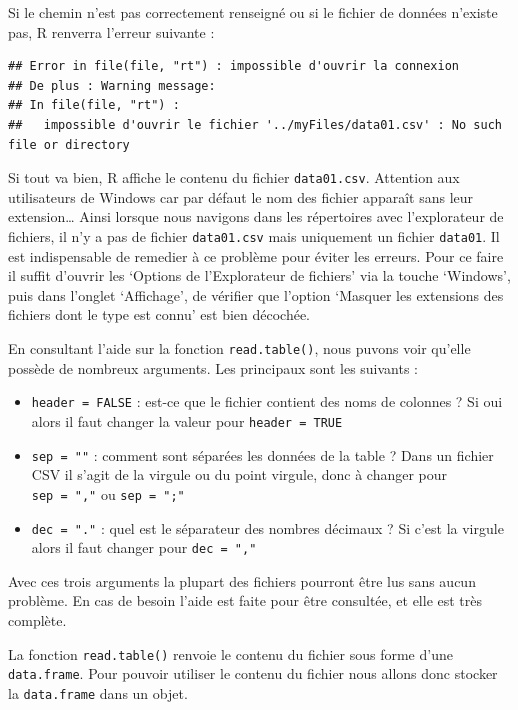 \documentclass[]{book}
\providecommand{\tightlist}{%
  \setlength{\itemsep}{0pt}\setlength{\parskip}{0pt}}
\begin{document}
Si le chemin n'est pas correctement renseigné ou si le fichier de données n'existe pas, R renverra l'erreur suivante :

\begin{verbatim}
## Error in file(file, "rt") : impossible d'ouvrir la connexion
## De plus : Warning message:
## In file(file, "rt") :
##   impossible d'ouvrir le fichier '../myFiles/data01.csv' : No such file or directory
\end{verbatim}

Si tout va bien, R affiche le contenu du fichier \texttt{data01.csv}. Attention aux utilisateurs de Windows car par défaut le nom des fichier apparaît sans leur extension\ldots{} Ainsi lorsque nous navigons dans les répertoires avec l'explorateur de fichiers, il n'y a pas de fichier \texttt{data01.csv} mais uniquement un fichier \texttt{data01}. Il est indispensable de remedier à ce problème pour éviter les erreurs. Pour ce faire il suffit d'ouvrir les `Options de l'Explorateur de fichiers' via la touche `Windows', puis dans l'onglet `Affichage', de vérifier que l'option `Masquer les extensions des fichiers dont le type est connu' est bien décochée.

En consultant l'aide sur la fonction \texttt{read.table()}, nous puvons voir qu'elle possède de nombreux arguments. Les principaux sont les suivants :

\begin{itemize}
\tightlist
\item
  \texttt{header\ =\ FALSE} : est-ce que le fichier contient des noms de colonnes ? Si oui alors il faut changer la valeur pour \texttt{header\ =\ TRUE}
\item
  \texttt{sep\ =\ ""} : comment sont séparées les données de la table ? Dans un fichier CSV il s'agit de la virgule ou du point virgule, donc à changer pour \texttt{sep\ =\ ","} ou \texttt{sep\ =\ ";"}
\item
  \texttt{dec\ =\ "."} : quel est le séparateur des nombres décimaux ? Si c'est la virgule alors il faut changer pour \texttt{dec\ =\ ","}
\end{itemize}

Avec ces trois arguments la plupart des fichiers pourront être lus sans aucun problème. En cas de besoin l'aide est faite pour être consultée, et elle est très complète.

La fonction \texttt{read.table()} renvoie le contenu du fichier sous forme d'une \texttt{data.frame}. Pour pouvoir utiliser le contenu du fichier nous allons donc stocker la \texttt{data.frame} dans un objet.
\end{document}
